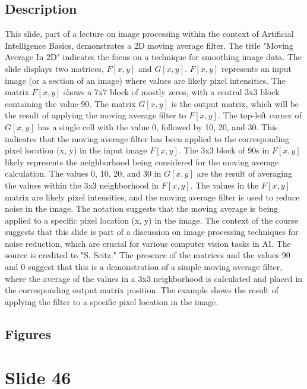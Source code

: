 \documentclass{article}%
\begin{document}
\subsection{Description}%
This slide, part of a lecture on image processing within the context of Artificial Intelligence Basics, demonstrates a 2D moving average filter.  The title "Moving Average In 2D" indicates the focus on a technique for smoothing image data.  The slide displays two matrices, $F[x, y]$ and $G[x, y]$.  $F[x, y]$ represents an input image (or a section of an image) where values are likely pixel intensities.  The matrix $F[x, y]$ shows a 7x7 block of mostly zeros, with a central 3x3 block containing the value 90.  The matrix $G[x, y]$ is the output matrix, which will be the result of applying the moving average filter to $F[x, y]$.  The top-left corner of $G[x, y]$ has a single cell with the value 0, followed by 10, 20, and 30.  This indicates that the moving average filter has been applied to the corresponding pixel location (x, y) in the input image $F[x, y]$. The 3x3 block of 90s in $F[x, y]$ likely represents the neighborhood being considered for the moving average calculation. The values 0, 10, 20, and 30 in $G[x, y]$ are the result of averaging the values within the 3x3 neighborhood in $F[x, y]$. The values in the $F[x, y]$ matrix are likely pixel intensities, and the moving average filter is used to reduce noise in the image. The notation suggests that the moving average is being applied to a specific pixel location (x, y) in the image. The context of the course suggests that this slide is part of a discussion on image processing techniques for noise reduction, which are crucial for various computer vision tasks in AI. The source is credited to "S. Seitz."  The presence of the matrices and the values 90 and 0 suggest that this is a demonstration of a simple moving average filter, where the average of the values in a 3x3 neighborhood is calculated and placed in the corresponding output matrix position. The example shows the result of applying the filter to a specific pixel location in the image.%
\subsection{Figures}%
\begin{figure}[H]%
\centering%
\end{figure}

%
\newpage%
\section{Slide 46}%
\label{sec:Slide46}%
\end{document}
